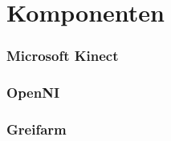 \section{Komponenten}
\begin{frame}
  \frametitle{Microsoft Kinect}

\end{frame}

\begin{frame}
  \frametitle{OpenNI}

\end{frame}



\begin{frame}
\frametitle{Greifarm}
\end{frame}